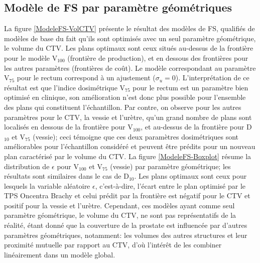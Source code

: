 \subsection{Modèle de FS par paramètre géométriques}
La figure \ref{ModeleFS-VolCTV} présente le résultat des modèles de FS, qualifiés de modèles de base du fait qu'ils sont optimisés avec un seul paramètre géométrique, le volume du CTV. Les plans optimaux sont ceux situés au-dessus de la frontière pour le modèle V$_{100}$ (frontière de production), et en dessous des frontières pour les autres paramètres (frontières de coût). Le modèle correspondant au paramètre V$_{75}$ pour le rectum correspond à un ajustement ($\sigma_{u} = 0$). L’interprétation de ce résultat est que l’indice dosimétrique V$_{75}$ pour le rectum est un paramètre bien optimisé en clinique, son amélioration n’est donc plus possible pour l’ensemble des plans qui constituent l’échantillon. Par contre, on observe pour les autres paramètres pour le CTV, la vessie et l’urètre, qu’un grand nombre de plans sont localisés en dessous de la frontière pour V$_{100}$, et au-dessus de la frontière pour D$_{10}$  et V$_{75}$ (vessie); ceci témoigne que ces deux paramètres dosimétriques sont améliorables pour l’échantillon considéré et peuvent être prédits pour un nouveau plan caractérisé par le volume du CTV. La figure \ref{ModeleFS-Boxplot} résume la distribution de $\epsilon$ pour V$_{100}$ et V$_{75}$ (vessie) par paramètre géométrique; les résultats sont similaires dans le cas de D$_{10}$. Les plans optimaux sont ceux pour lesquels la variable aléatoire $\epsilon$, c'est-à-dire, l'écart entre le plan optimisé par le TPS Oncentra Brachy et celui prédit par la frontière est négatif pour le CTV et positif pour la vessie et l'urètre. Cependant, ces modèles ayant comme seul paramètre géométrique, le volume du CTV, ne sont pas représentatifs de la réalité, étant donné que la couverture de la prostate est influencée par d’autres paramètres géométriques, notamment: les volumes des autres structures et leur proximité mutuelle par rapport au CTV, d'où l'intérêt de les combiner linéairement dans un modèle global.
%
